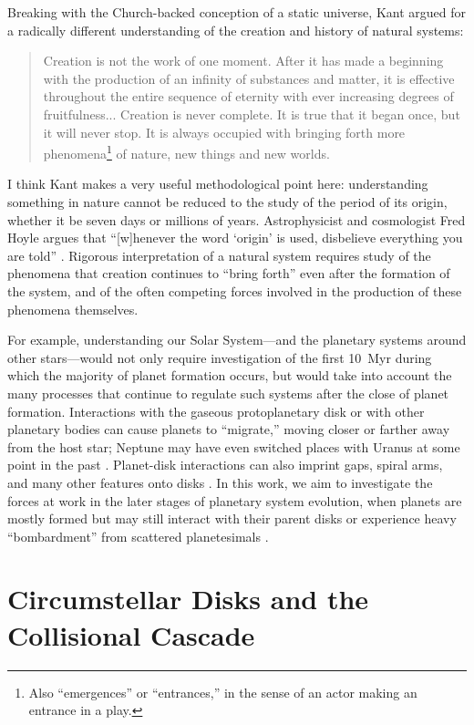 \documentclass[12pt,oneside]{book}
\begin{document}
Breaking with the Church-backed conception of a static universe, Kant argued for a radically different understanding of the creation and history of natural systems:
\begin{quote}
  \onehalfspacing
  Creation is not the work of one moment. 
  After it has made a beginning with the production of an infinity of substances and matter, it is effective throughout the entire sequence of eternity with ever increasing degrees of fruitfulness... 
  Creation is never complete. 
  It is true that it began once, but it will never stop. 
  It is always occupied with bringing forth more phenomena\footnote{Also ``emergences'' or ``entrances,'' in the sense of an actor making an entrance in a play.} of nature, new things and new worlds. \citep[][266-67]{kant_2012}
\end{quote}
I think Kant makes a very useful methodological point here: understanding something in nature cannot be reduced to the study of the period of its origin, whether it be seven days or millions of years.
Astrophysicist and cosmologist Fred Hoyle argues that ``[w]henever the word ‘origin’ is used, disbelieve everything you are told'' \citep{hoyle93}.
Rigorous interpretation of a natural system requires study of the phenomena that creation continues to ``bring forth'' even after the formation of the system, and of the often competing forces involved in the production of these phenomena themselves.

For example, understanding our Solar System---and the planetary systems around other stars---would not only require investigation of the first \SI{10}{Myr} during which the majority of planet formation occurs, but would take into account the many processes that continue to regulate such systems after the close of planet formation.
Interactions with the gaseous protoplanetary disk or with other planetary bodies can cause planets to ``migrate,'' moving closer or farther away from the host star; Neptune may have even switched places with Uranus at some point in the past \citep{lublow10,tsiganis05}.
Planet-disk interactions can also imprint gaps, spiral arms, and many other features onto disks \citep[see][]{hughes18}.
In this work, we aim to investigate the forces at work in the later stages of planetary system evolution, when planets are mostly formed but may still interact with their parent disks or experience heavy ``bombardment'' from scattered planetesimals \citep{wyatt2008}.

\section{Circumstellar Disks and the Collisional Cascade}
\label{disks, cascade intro}
\end{document}
